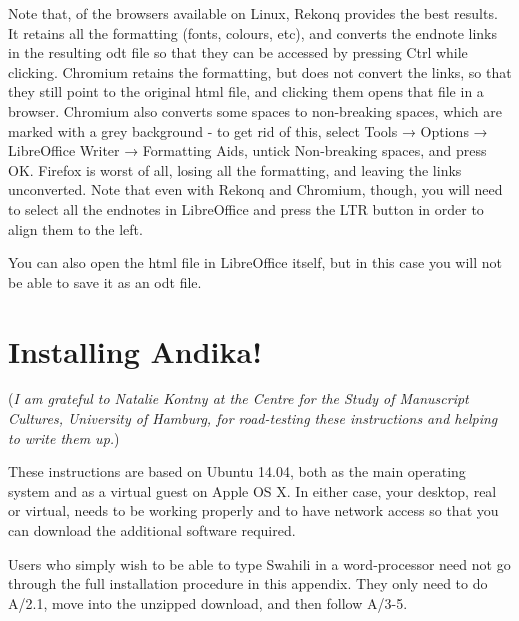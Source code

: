\documentclass[a4paper,10pt, oneside]{book}
\begin{document}
Note that, of the browsers available on Linux, Rekonq provides the best results. It retains all the formatting (fonts, colours, etc), and converts the endnote links in the resulting odt file so that they can be accessed by pressing Ctrl while clicking. Chromium retains the formatting, but does not convert the links, so that they still point to the original html file, and clicking them opens that file in a browser. Chromium also converts some spaces to non-breaking spaces, which are marked with a grey background - to get rid of this, select Tools → Options → LibreOffice Writer → Formatting Aids, untick Non-breaking spaces, and press OK. Firefox is worst of all, losing all the formatting, and leaving the links unconverted. Note that even with Rekonq and Chromium, though, you will need to select all the endnotes in LibreOffice and press the LTR button in order to align them to the left.

You can also open the html file in LibreOffice itself, but in this case you will not be able to save it as an odt file. 


\newpage

\renewcommand{\bibname}{References}




\newpage

\appendix  %


\chapter{Installing \textbf{Andika!}}
\renewcommand{\thesection}{A/\arabic{section}}  %
\setcounter{section}{0}  %

(\textit{I am grateful to Natalie Kontny at the Centre for the Study of Manuscript Cultures, University of Hamburg, for road-testing these instructions and helping to write them up.})

These instructions are based on Ubuntu 14.04, both as the main operating system and as a virtual guest on Apple OS X. In either case, your desktop, real or virtual, needs to be working properly and to have network access so that you can download the additional software required.

Users who simply wish to be able to type Swahili in a word-processor need not go through the full installation procedure in this appendix.  They only need to do A/2.1, move into the unzipped download, and then follow A/3-5.
\end{document}
